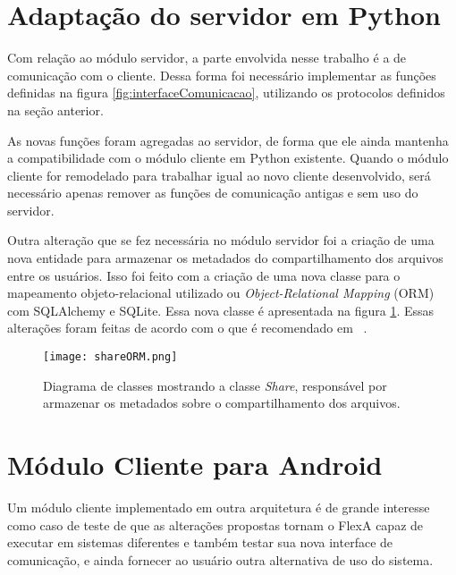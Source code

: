         \section{Adaptação do servidor em Python}
        
        
        Com relação ao módulo servidor, a parte envolvida nesse trabalho é a de comunicação com o cliente. Dessa forma foi necessário implementar as funções definidas na figura \ref{fig:interfaceComunicacao}, utilizando os protocolos definidos na seção anterior.
        
        As novas funções foram agregadas ao servidor, de forma que ele ainda mantenha a compatibilidade com o módulo cliente em Python existente. Quando o módulo cliente for remodelado para trabalhar igual ao novo cliente desenvolvido, será necessário apenas remover as funções de comunicação antigas e sem uso do servidor.
        
        Outra alteração que se fez necessária no módulo servidor foi a criação de uma nova entidade para armazenar os metadados do compartilhamento dos arquivos entre os usuários. Isso foi feito com a criação de uma nova classe para o mapeamento objeto-relacional utilizado ou \textit{Object-Relational Mapping} (ORM) com SQLAlchemy e SQLite. Essa nova classe é apresentada na figura \ref{fig:shareORM}. Essas alterações foram feitas de acordo com o que é recomendado em ~.
        
        \begin{figure}
        \centering
        \texttt{[image: shareORM.png]}
        \caption{Diagrama de classes mostrando a classe \textit{Share}, responsável por armazenar os metadados sobre o compartilhamento dos arquivos.}
        \label{fig:shareORM}
        \end{figure}
        
        \section{Módulo Cliente para Android}
        
     
        Um módulo cliente implementado em outra arquitetura é de grande interesse como caso de teste de que as alterações propostas tornam o FlexA capaz de executar em sistemas diferentes e também testar sua nova interface de comunicação, e ainda fornecer ao usuário outra alternativa de uso do sistema.
        
